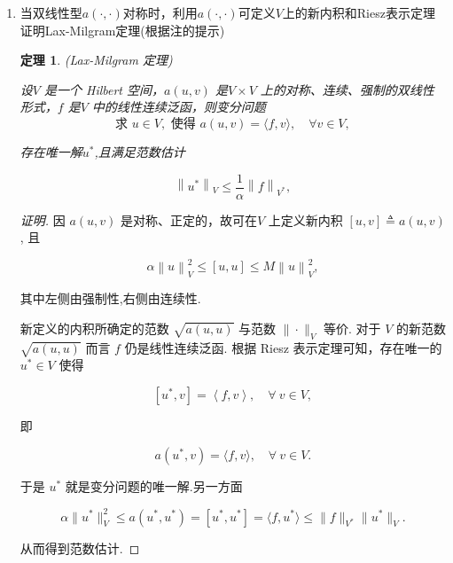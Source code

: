 \documentclass[12pt,a4paper]{article}
\newtheorem{theorem}{定理}
\begin{document}
\begin{enumerate}
\begin{proof}[解]
			若$u\in H^{4}(\Omega),v\in H^{2}(\Omega).$, 则可用 $\Delta u$ 代替\eqref{green4}中的 $u$, 可得
			
			$$
			\int_\Omega\Delta u\Delta v\mathrm{d}\boldsymbol{x}=\int_\Omega v\Delta^2u\mathrm{d}\boldsymbol{x}-\int_\Gamma v\frac{\partial\Delta u}{\partial n}\mathrm{d}s+\int_\Gamma\Delta u\frac{\partial v}{\partial n}\mathrm{d}s
			$$
			
		\end{proof}
		
		\item 
		当双线性型$a(\cdot,\cdot)$对称时，利用$a(\cdot,\cdot)$可定义$V$上的新内积和Riesz表示定理证明Lax-Milgram定理(根据注的提示)
		
		\begin{theorem}(Lax-Milgram 定理)
			
			设$V$ 是一个 Hilbert 空间，$a(u,v)$ 是$V\times V$ 上的对称、连续、强制的双线性形式，$f$ 是$V$ 中的线性连续泛函，则变分问题
			$$\text{求 }u\in V,\text{ 使得 }a(u,v)=\langle f,v\rangle,\quad\forall v\in V,$$
			
			存在唯一解$u^*$,且满足范数估计
			
			$$
			\left\|u^*\right\|_V\leqslant\frac{1}{\alpha}\left\|f\right\|_{V^*},
			$$

		\end{theorem}
		
		\begin{proof}[证明]
			因 $a(u,v)$ 是对称、正定的，故可在$V$ 上定义新内积 $[u,v]\triangleq a(u,v)$, 且
			
			$$
			\alpha{\left\|u\right\|}_{V}^{2}\leqslant\left[u,u\right]\leqslant M{\left\|u\right\|}_{V}^{2},
			$$
			
			其中左侧由强制性,右侧由连续性.
			
			新定义的内积所确定的范数 $\sqrt{a(u,u)}$ 与范数 $\|\cdot\|_V$ 等价. 对于 $V$ 的新范数$\sqrt{a(u,u)}$ 而言 $f$ 仍是线性连续泛函. 根据 Riesz 表示定理可知，存在唯一的 $u^*\in V$ 使得
			
			$$
			[u^*,v]=\left\langle f,v\right\rangle,\quad\forall\:v\in V,
			$$
			
			即
			
			$$
			a(u^*,v)=\langle f,v\rangle,\quad\forall\:v\in V.
			$$
			
			于是 $u^*$ 就是变分问题的唯一解.另一方面
			
			$$
			\alpha\|u^*\|_V^2\leqslant a(u^*,u^*)=[u^*,u^*]=\langle f,u^*\rangle\leqslant\|f\|_{V^*}\|u^*\|_V.
			$$
			
			从而得到范数估计.
		\end{proof}
		

\end{enumerate}
\end{document}
